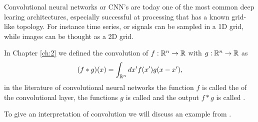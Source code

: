 \documentclass[../3.tex]{subfiles}
\begin{document}
    Convolutional neural networks or CNN's are today one of the most common deep learing architectures, especially successful at processing
    that has a known grid-like topology. For instance time series, or signals can be sampled in a 1D grid, while images can be thought as a 2D grid.
    
    In Chapter \ref{ch:2} we defined the convolution of $f:\mathbb{R}^n \to \mathbb{R}$ with $g:\mathbb{R}^n \to \mathbb{R}$ as
    \[ (f * g)(x) = \int_{\mathbb{R}^n} dx' f(x')g(x-x'), \]
    in the literature of convolutional neural networks the function $f$ is called the  of the
    convolutional layer, the functions $g$ is called  and the output $f*g$ is called .

    To give an interpretation of convolution we will discuss an example from \cite{deep}.
\end{document}
